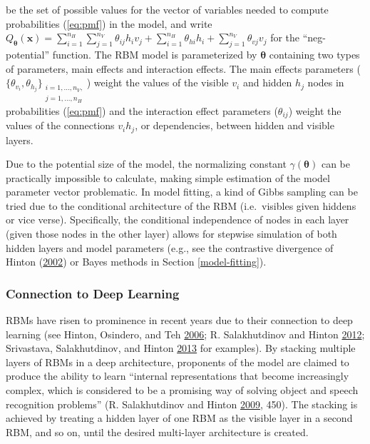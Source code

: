 \documentclass[12pt]{article}
\theoremstyle{definition}
\newcommand{\nv}{{n_{\scriptscriptstyle V}}}
\newcommand{\nh}{{n_{\scriptscriptstyle H}}}
\begin{document}
be the set of possible values for the vector of variables needed to
compute probabilities (\eqref{eq:pmf}) in the model, and write
\(Q_{\boldsymbol \theta}(\boldsymbol x) = \sum\limits_{i = 1}^\nh\sum\limits_{j=1}^\nv \theta_{ij} h_i v_j + \sum\limits_{i = 1}^\nh\theta_{hi} h_i + \sum\limits_{j = 1}^\nv\theta_{vj} v_j\)
for the ``neg-potential'' function. The RBM model is parameterized by
\(\boldsymbol \theta\) containing two types of parameters, main effects
and interaction effects. The main effects parameters
(\(\{\theta_{v_i}, \theta_{h_j}\}_{\substack{i = 1, \dots, \nv,\\j = 1, \dots, \nh}}\))
weight the values of the visible \(v_i\) and hidden \(h_j\) nodes in
probabilities (\eqref{eq:pmf}) and the interaction effect parameters
(\(\theta_{ij}\)) weight the values of the connections \(v_i h_j\), or
dependencies, between hidden and visible layers.

Due to the potential size of the model, the normalizing constant
\(\gamma(\boldsymbol \theta)\) can be practically impossible to
calculate, making simple estimation of the model parameter vector
problematic. In model fitting, a kind of Gibbs sampling can be tried due
to the conditional architecture of the RBM (i.e.~visibles given hiddens
or vice verse). Specifically, the conditional independence of nodes in
each layer (given those nodes in the other layer) allows for stepwise
simulation of both hidden layers and model parameters (e.g., see the
contrastive divergence of Hinton
(\protect\hyperlink{ref-hinton2002training}{2002}) or Bayes methods in
Section \ref{model-fitting}).

\subsubsection{Connection to Deep
Learning}\label{connection-to-deep-learning}

RBMs have risen to prominence in recent years due to their connection to
deep learning (see Hinton, Osindero, and Teh
\protect\hyperlink{ref-hinton2006fast}{2006}; R. Salakhutdinov and
Hinton \protect\hyperlink{ref-salakhutdinov2012efficient}{2012};
Srivastava, Salakhutdinov, and Hinton
\protect\hyperlink{ref-srivastava2013modeling}{2013} for examples). By
stacking multiple layers of RBMs in a deep architecture, proponents of
the model are claimed to produce the ability to learn ``internal
representations that become increasingly complex, which is considered to
be a promising way of solving object and speech recognition problems''
(R. Salakhutdinov and Hinton
\protect\hyperlink{ref-salakhutdinov2009deep}{2009}, 450). The stacking
is achieved by treating a hidden layer of one RBM as the visible layer
in a second RBM, and so on, until the desired multi-layer architecture
is created.
\end{document}
